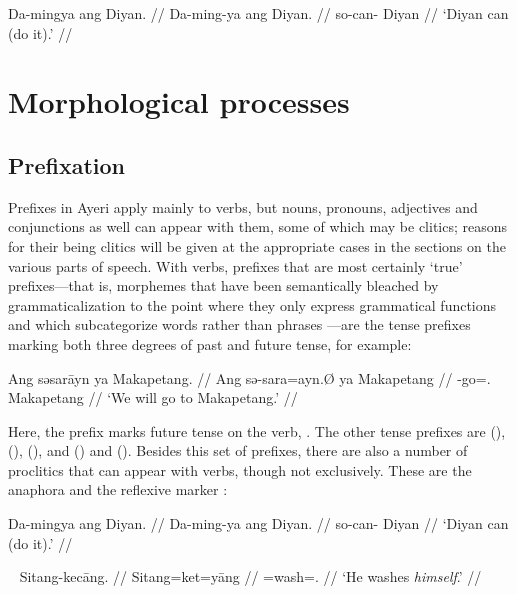 \ex\begingl
	\gla Da-mingya ang Diyan. //
	\glb Da-ming-ya ang Diyan. //
	\glc so-can-\TsgM{} \Aarg{} Diyan //
	\glft `Diyan can (do it).' //
\endgl\xe

\section{Morphological processes}

\subsection{Prefixation}

Prefixes in Ayeri apply mainly to verbs, but nouns, pronouns, adjectives and 
conjunctions as well can appear with them, some of which may be clitics; 
reasons for their being clitics will be given at the appropriate cases in the 
sections on the various parts of speech. With verbs, prefixes that are most 
certainly `true' prefixes---that is, morphemes that have been semantically 
bleached by grammaticalization to the point where they only express grammatical 
functions \citep[157ff.]{lehmann2015} and which subcategorize words rather than 
phrases \citep[117]{klavans1985}---are the tense prefixes marking both three 
degrees of past and future tense, for example:

\ex\begingl
	\gla Ang səsarāyn ya Makapetang. //
	\glb Ang sə-sara=ayn.Ø ya Makapetang //
	\glc \AgtT{} \Fut{}-go=\Fpl{}.\Top{} \Loc{} Makapetang //
	\glft `We will go to Makapetang.' //
\endgl\xe

Here, the prefix  marks future tense on the verb, 
. The other tense prefixes are  
(\NPst{}),  (\Pst{}),  (\RPst{}), and 
 (\NFut{}) and  (\RFut{}). Besides this set of 
prefixes, there are also a number of proclitics that can appear with verbs, 
though not exclusively. These are the anaphora  
and the reflexive marker :
 
\ex\begingl
	\gla Da-mingya ang Diyan. //
	\glb Da-ming-ya ang Diyan. //
	\glc so-can-\TsgM{} \Aarg{} Diyan //
	\glft `Diyan can (do it).' //
\endgl
% 
\xe

\ex~\begingl
	\gla Sitang-kecāng. //
	\glb Sitang=ket=yāng //
	\glc \Refl{}=wash=\TsgM{}.\Aarg{} //
	\glft `He washes \emph{himself}.' //
\endgl\xe

